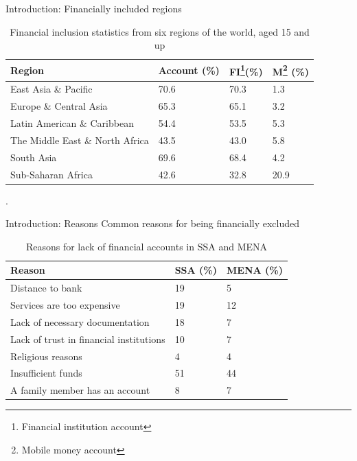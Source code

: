 \documentclass[10pt]{beamer}
\begin{document}
\begin{frame}{Introduction: Financially included regions}
    \vspace{.5cm}
    \begin{table}[!ht]
    \begin{tabular}{|l|l|l|l|}
    \hline
    \textbf{Region}       & \textbf{Account (\%)} & \textbf{FI\footnote{Financial institution account}(\%)} & \textbf{M\footnote{Mobile money account} (\%)} \\ \hline
    East Asia \& Pacific    & 70.6          & 70.3           & 1.3                \\ \hline
    Europe \& Central Asia    & 65.3          & 65.1           & 3.2                \\ \hline
    Latin American \& Caribbean & 54.4          & 53.5           & 5.3                \\ \hline
    The Middle East \& North Africa & 43.5          & 43.0           & 5.8                \\ \hline
    South Asia          & 69.6          & 68.4           & 4.2                \\ \hline
    Sub-Saharan Africa      & 42.6          & 32.8           & 20.9                 \\ \hline
    \end{tabular}
    \caption{Financial inclusion statistics from six regions of the world, aged 15 and up}.
    \label{tab:financial_statistics}
    \end{table}
\end{frame}

\begin{frame}{Introduction: Reasons}
    Common reasons for being financially excluded
    \vspace{.5cm}
        \begin{table}[!ht]
        \centering
        \begin{tabular}{|l|l|l|}
        \hline
        \textbf{Reason} & \textbf{SSA (\%)} & \textbf{MENA (\%)} \\ \hline
        Distance to bank & 19 & 5 \\ \hline
        Services are too expensive & 19 & 12 \\ \hline
        Lack of necessary documentation & 18 & 7 \\ \hline
        Lack of trust in financial institutions & 10 & 7 \\ \hline
        Religious reasons & 4 & 4 \\ \hline
        Insufficient funds & 51 & 44 \\ \hline
        A family member has an account & 8 & 7\\ \hline
        \end{tabular}
        \vspace{0.1cm}\caption{Reasons for lack of financial accounts in SSA and MENA}
        \label{tab:ssa_mena_reasons}
        \end{table}
\end{frame}
\end{document}
